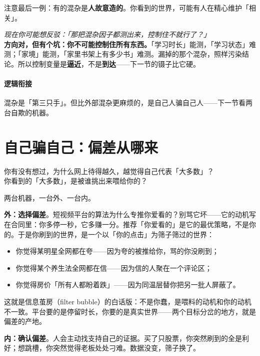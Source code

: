 \documentclass[../../main2.tex]{subfiles}
\begin{document}
注意最后一例：有的混杂是\textbf{人故意造的}。你看到的世界，可能有人在精心维护「相关」。

\begin{questionbox}
	\textit{现在你可能想反驳：「那把混杂因子都测出来，控制住不就行了？」}\\
	\textbf{方向对，但有个坑：你不可能控制住所有东西。}「学习时长」能测，「学习状态」难测；「家境」能测，「家里书架上有多少书」难测。漏掉的那个混杂，照样污染结论。所以控制变量是\textbf{逼近}，不是\textbf{到达}——下一节的镊子比它硬。
\end{questionbox}

\paragraph*{逻辑衔接}
	混杂是「第三只手」。但比外部混杂更麻烦的，是自己人骗自己人——下一节看两台自欺的机器。

\section{自己骗自己：偏差从哪来}

\begin{readingnote}
	你有没有想过，为什么网上待得越久，越觉得自己代表「大多数」？\\
	你看到的「大多数」，是被谁挑出来喂给你的？
\end{readingnote}

两台机器，一台外、一台内。

\textbf{外：选择偏差}。短视频平台的算法为什么专推你爱看的？别骂它坏——它的动机写在合同里：你多停一秒，它多赚一分。推荐「你爱看的」是它的最优策略，不是你的。于是你刷到的世界，是一个以「你的点击」为筛子筛过的世界：

\begin{itemize}
	\item 你觉得某明星全网都在夸——因为夸的被推给你，骂的你没刷到；
	\item 你觉得某个养生法全网都在信——因为信的人聚在一个评论区；
	\item 你觉得房价「所有人都盼着跌」——因为同温层替你把另一批人屏蔽了。
\end{itemize}

这就是信息茧房（filter bubble）的白话版：不是你蠢，是喂料的动机和你的动机不一致。平台要的是停留时长，你要的是真实世界——两个目标分岔的地方，就是偏差的产地。

\textbf{内：确认偏差}。人会主动找支持自己的证据。买了只股票，你突然刷到的全是利好；想跳槽，你突然觉得老板处处刁难。数据没变，筛子换了。
\end{document}
